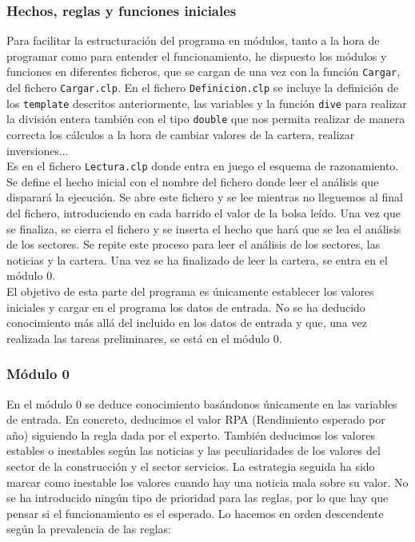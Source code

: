 \documentclass[11pt,leqno]{article}
\theoremstyle{definition_wo_parentheses}
\theoremstyle{plain}
\theoremstyle{remark}
\begin{document}
\subsubsection{Hechos, reglas y funciones iniciales}
	
	Para facilitar la estructuración del programa en módulos, tanto a la hora de programar como para entender el funcionamiento, he dispuesto los módulos y funciones en diferentes ficheros, que se cargan de una vez con la función \texttt{Cargar}, del fichero \texttt{Cargar.clp}. En el fichero \texttt{Definicion.clp} se incluye la definición de los \texttt{template} descritos anteriormente, las variables y la función \texttt{dive} para realizar la división entera también con el tipo \texttt{double} que nos permita realizar de manera correcta los cálculos a la hora de cambiar valores de la cartera, realizar inversiones...\\
	Es en el fichero \texttt{Lectura.clp} donde entra en juego el esquema de razonamiento. Se define el hecho inicial con el nombre del fichero donde leer el análisis que disparará la ejecución. Se abre este fichero y se lee mientras no lleguemos al final del fichero, introduciendo en cada barrido el valor de la bolsa leído. Una vez que se finaliza, se cierra el fichero y se inserta el hecho que hará que se lea el análisis de los sectores. Se repite este proceso para leer el análisis de los sectores, las noticias y la cartera. Una vez se ha finalizado de leer la cartera, se entra en el módulo 0.\\
	
	El objetivo de esta parte del programa es únicamente establecer los valores iniciales y cargar en el programa los datos de entrada. No se ha deducido conocimiento más allá del incluido en los datos de entrada y que, una vez realizada las tareas preliminares, se está en el módulo 0.

	
\subsubsection{Módulo 0}
	
	En el módulo 0 se deduce conocimiento basándonos únicamente en las variables de entrada. En concreto, deducimos el valor RPA (Rendimiento esperado por año) siguiendo la regla dada por el experto. También deducimos los valores estables o inestables según las noticias y las peculiaridades de los valores del sector de la construcción y el sector servicios. La estrategia seguida ha sido marcar como inestable los valores cuando hay una noticia mala sobre su valor. No se ha introducido ningún tipo de prioridad para las reglas, por lo que hay que pensar si el funcionamiento es el esperado. Lo hacemos en orden descendente según la prevalencia de las reglas:
	
\end{document}
